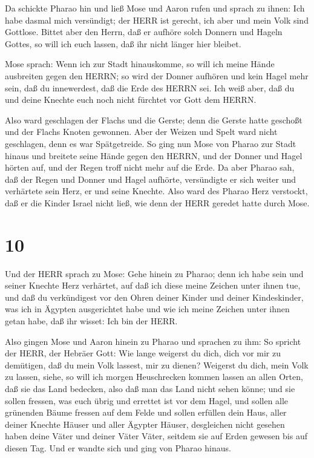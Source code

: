  Da schickte Pharao hin und ließ Mose und Aaron rufen und
sprach zu ihnen: Ich habe dasmal mich versündigt; der HERR ist gerecht,
ich aber und mein Volk sind Gottlose.  Bittet aber den
Herrn, daß er aufhöre solch Donnern und Hageln Gottes, so will ich euch
lassen, daß ihr nicht länger hier bleibet.

 Mose sprach: Wenn ich zur Stadt hinauskomme, so will ich
meine Hände ausbreiten gegen den HERRN; so wird der Donner aufhören und
kein Hagel mehr sein, daß du innewerdest, daß die Erde des HERRN sei.
 Ich weiß aber, daß du und deine Knechte euch noch nicht
fürchtet vor Gott dem HERRN.

 Also ward geschlagen der Flachs und die Gerste; denn die
Gerste hatte geschoßt und der Flachs Knoten gewonnen.  Aber
der Weizen und Spelt ward nicht geschlagen, denn es war Spätgetreide.
 So ging nun Mose von Pharao zur Stadt hinaus und breitete
seine Hände gegen den HERRN, und der Donner und Hagel hörten auf, und
der Regen troff nicht mehr auf die Erde.  Da aber Pharao
sah, daß der Regen und Donner und Hagel aufhörte, versündigte er sich
weiter und verhärtete sein Herz, er und seine Knechte. 
Also ward des Pharao Herz verstockt, daß er die Kinder Israel nicht
ließ, wie denn der HERR geredet hatte durch Mose.

\hypertarget{section-9}{%
\section{10}\label{section-9}}

 Und der HERR sprach zu Mose: Gehe hinein zu Pharao; denn
ich habe sein und seiner Knechte Herz verhärtet, auf daß ich diese meine
Zeichen unter ihnen tue,  und daß du verkündigest vor den
Ohren deiner Kinder und deiner Kindeskinder, was ich in Ägypten
ausgerichtet habe und wie ich meine Zeichen unter ihnen getan habe, daß
ihr wisset: Ich bin der HERR.

 Also gingen Mose und Aaron hinein zu Pharao und sprachen zu
ihm: So spricht der HERR, der Hebräer Gott: Wie lange weigerst du dich,
dich vor mir zu demütigen, daß du mein Volk lassest, mir zu dienen?
 Weigerst du dich, mein Volk zu lassen, siehe, so will ich
morgen Heuschrecken kommen lassen an allen Orten,  daß sie
das Land bedecken, also daß man das Land nicht sehen könne; und sie
sollen fressen, was euch übrig und errettet ist vor dem Hagel, und
sollen alle grünenden Bäume fressen auf dem Felde  und
sollen erfüllen dein Haus, aller deiner Knechte Häuser und aller Ägypter
Häuser, desgleichen nicht gesehen haben deine Väter und deiner Väter
Väter, seitdem sie auf Erden gewesen bis auf diesen Tag. Und er wandte
sich und ging von Pharao hinaus.

